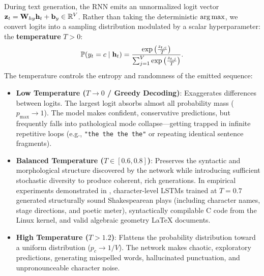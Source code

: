 \documentclass[../../main.tex]{subfiles}
\begin{document}
During text generation, the RNN emits an unnormalized logit vector $\mathbf{z}_t = \mathbf{W}_{hy} \mathbf{h}_t + \mathbf{b}_y \in \mathbb{R}^V$. Rather than taking the deterministic $\operatorname*{\mathrm{arg\,max}}$, we convert logits into a sampling distribution modulated by a scalar hyperparameter: the \textbf{temperature} $T > 0$:
\begin{equation}
\label{eq:temperature_sampling}
\mathbb{P}(y_t = c \mid \mathbf{h}_t) = \frac{\exp\left( \frac{z_{t, c}}{T} \right)}{\sum_{j=1}^V \exp\left( \frac{z_{t, j}}{T} \right)}.
\end{equation}
The temperature controls the entropy and randomness of the emitted sequence:
\begin{itemize}
    \item \textbf{Low Temperature ($T \to 0$ / Greedy Decoding)}: Exaggerates differences between logits. The largest logit absorbs almost all probability mass ($p_{\max} \to 1$). The model makes confident, conservative predictions, but frequently falls into pathological mode collapse---getting trapped in infinite repetitive loops (e.g., \texttt{"the the the the"} or repeating identical sentence fragments).
    \item \textbf{Balanced Temperature ($T \in [0.6, 0.8]$)}: Preserves the syntactic and morphological structure discovered by the network while introducing sufficient stochastic diversity to produce coherent, rich generations. In empirical experiments demonstrated in \cite{karpathy2015rnn}, character-level LSTMs trained at $T=0.7$ generated structurally sound Shakespearean plays (including character names, stage directions, and poetic meter), syntactically compilable C code from the Linux kernel, and valid algebraic geometry LaTeX documents.
    \item \textbf{High Temperature ($T > 1.2$)}: Flattens the probability distribution toward a uniform distribution ($p_c \to 1/V$). The network makes chaotic, exploratory predictions, generating misspelled words, hallucinated punctuation, and unpronounceable character noise.
\end{itemize}

\medskip
\end{document}
